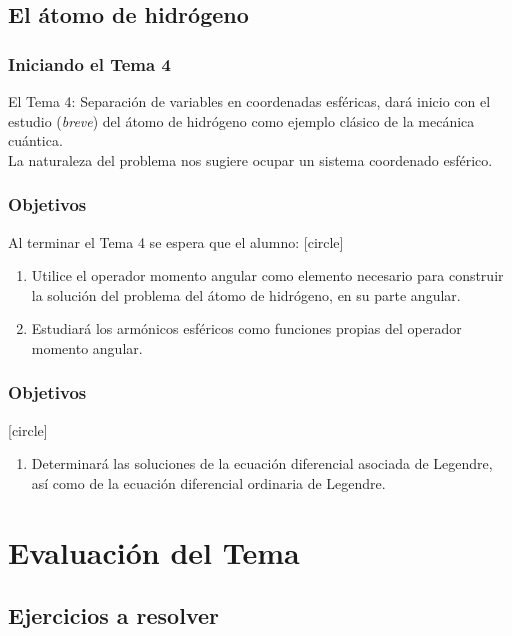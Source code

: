 \documentclass[12pt]{beamer}
\begin{document}
\subsection{El átomo de hidrógeno}

\begin{frame}
\frametitle{Iniciando el Tema 4}
El Tema 4: Separación de variables en coordenadas esféricas, dará inicio con el estudio (\emph{breve}) del átomo de hidrógeno como ejemplo clásico de la mecánica cuántica.
\\
\bigskip
\pause
La naturaleza del problema nos sugiere ocupar un sistema coordenado esférico.
\end{frame}
\begin{frame}
\frametitle{Objetivos}
Al terminar el Tema 4 se espera que el alumno:
[circle]
\begin{enumerate}[<+->]
\item Utilice el operador momento angular como elemento necesario para construir la solución del problema del átomo de hidrógeno, en su parte angular.
\item Estudiará los armónicos esféricos como funciones propias del operador momento angular.
\seti
\end{enumerate}
\end{frame}
\begin{frame}
\frametitle{Objetivos}
[circle]
\begin{enumerate}[<+->]
\conti
\item Determinará las soluciones de la ecuación diferencial asociada de Legendre, así como de la ecuación diferencial ordinaria de Legendre.
\end{enumerate}
\end{frame}

\section{Evaluación del Tema}
\subsection{Ejercicios a resolver}
\end{document}
